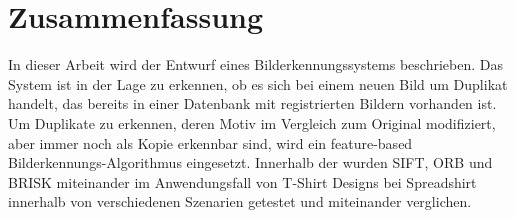 
\chapter*{Zusammenfassung}
\label{sec:Zusammenfassung}
In dieser Arbeit wird der Entwurf eines Bilderkennungssystems beschrieben. 
Das System ist in der Lage  zu erkennen, ob es sich bei einem neuen Bild um Duplikat handelt, das bereits in einer Datenbank mit registrierten Bildern vorhanden ist.
Um Duplikate zu erkennen, deren Motiv im Vergleich zum Original modifiziert, aber immer noch als Kopie erkennbar sind, wird ein feature-based Bilderkennungs-Algorithmus eingesetzt. 
Innerhalb der wurden SIFT, ORB und BRISK miteinander im Anwendungsfall von T-Shirt Designs bei Spreadshirt innerhalb von verschiedenen Szenarien getestet und miteinander verglichen.
